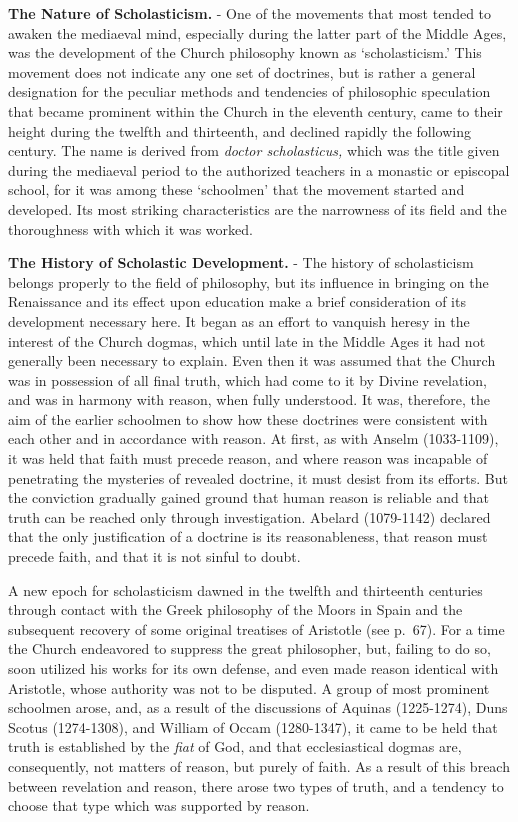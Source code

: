 \documentclass[
]{book}
\begin{document}
\textbf{The Nature of Scholasticism.} - One of the movements that most tended to awaken the mediaeval mind, especially during the latter part of the Middle Ages, was the development of the Church philosophy known as `scholasticism.' This movement does not indicate any one set of doctrines, but is rather a general designation for the peculiar methods and tendencies of philosophic speculation that became prominent within the Church in the eleventh century, came to their height during the twelfth and thirteenth, and declined rapidly the following century. The name is derived from \emph{doctor scholasticus,} which was the title given during the mediaeval period to the authorized teachers in a monastic or episcopal school, for it was among these `schoolmen' that the movement started and developed. Its most striking characteristics are the narrowness of its field and the thoroughness with which it was worked.

\textbf{The History of Scholastic Development.} - The history of scholasticism belongs properly to the field of philosophy, but its influence in bringing on the Renaissance and its effect upon education make a brief consideration of its development necessary here. It began as an effort to vanquish heresy in the interest of the Church dogmas, which until late in the Middle Ages it had not generally been necessary to explain. Even then it was assumed that the Church was in possession of all final truth, which had come to it by Divine revelation, and was in harmony with reason, when fully understood. It was, therefore, the aim of the earlier schoolmen to show how these doctrines were consistent with each other and in accordance with reason. At first, as with Anselm (1033-1109), it was held that faith must precede reason, and where reason was incapable of penetrating the mysteries of revealed doctrine, it must desist from its efforts. But the conviction gradually gained ground that human reason is reliable and that truth can be reached only through investigation. Abelard (1079-1142) declared that the only justification of a doctrine is its reasonableness, that reason must precede faith, and that it is not sinful to doubt.

A new epoch for scholasticism dawned in the twelfth and thirteenth centuries through contact with the Greek philosophy of the Moors in Spain and the subsequent recovery of some original treatises of Aristotle (see p.~67). For a time the Church endeavored to suppress the great philosopher, but, failing to do so, soon utilized his works for its own defense, and even made reason identical with Aristotle, whose authority was not to be disputed. A group of most prominent schoolmen arose, and, as a result of the discussions of Aquinas (1225-1274), Duns Scotus (1274-1308), and William of Occam (1280-1347), it came to be held that truth is established by the \emph{fiat} of God, and that ecclesiastical dogmas are, consequently, not matters of reason, but purely of faith. As a result of this breach between revelation and reason, there arose two types of truth, and a tendency to choose that type which was supported by reason.
\end{document}
